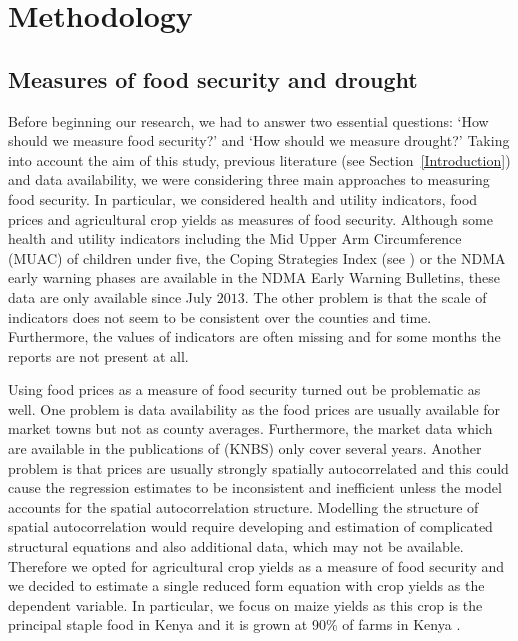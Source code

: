 \documentclass[a4paper,12pt]{article}
\begin{document}
\section{Methodology}\label{Method}

\subsection{Measures of food security and drought}

Before beginning our research, we had to answer two essential %
questions: `How should we measure food security?' and `How should we measure drought?' Taking into account the aim of this study, previous literature (see Section~\ref{Introduction}) and data availability, we were considering three main approaches to measuring food security. In particular, we considered health and utility indicators, food prices and agricultural crop yields as measures of food security. Although some health and utility indicators including the Mid Upper Arm Circumference (MUAC) of children under five, the Coping Strategies Index (see \citealp{CSI}) or the NDMA early warning phases are available in the NDMA Early Warning Bulletins, these data are only available since July $2013$. The other problem is that the scale of indicators does not seem to be consistent over the counties and time. Furthermore, the values of indicators are often missing and for some months the reports are not present at all.

Using food prices as a measure of food security turned out be problematic as well. 
One problem is data availability as the food prices are usually available for market towns but not as county averages. Furthermore, the market data which are available in the publications of \cite{KNBS} (KNBS) only cover several years. Another problem is that prices are usually strongly spatially autocorrelated and this could cause the regression estimates to be inconsistent and inefficient unless the model accounts for the spatial autocorrelation structure. Modelling the structure of spatial autocorrelation would require developing and estimation of complicated structural equations and also additional data, which may not be available. Therefore we opted for agricultural crop yields as a measure of food security and we decided to estimate a single reduced form equation with crop yields as the dependent variable. In particular, we focus on maize yields as this crop is the principal staple food in Kenya and it is grown at 90\% of farms in Kenya \citep{FAO}.
\end{document}
